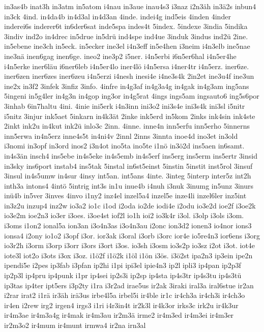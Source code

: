 {in3as4b
inat3h
in3atm
in5atom
i4nau
in3aue
inau4s3
i3naz
i2n3äh
in3ä2s
inbun4
in3ck
4ind.
in4da4b
in4d3al
in4d3an
4inde.
indei4g
ind5eis
4inden
4inder
inderei6s
inderer6t
in6der6sat
inde5spa
indes4t
5index.
5indexe
3india
5indika
3indiv
ind2o
in4drec
in5drue
in5drü
ind4spe
ind4ue
3induk
3indus
ind2ü
2ine.
in5ebene
ine3ch
in5eck.
in5ecker
ine3el
i4n3eff
in5e4hen
i3neim
i4n3elb
ine5nae
ine3nä
inen6gag
inen6ge.
ineo2
ine3p2
i5ner.
i4n5erbi
i6n5er6hal
i4n5er4he
i4n5erke
iner6läu
i6ner6leb
i4n5er4lo
iner4lö
i4n5ersa
i4ner4tr
i4n5erz.
iner6ze.
iner6zen
iner6zes
iner6zeu
i4n5erzi
i4nesh
inesi4e
i4ne3s4k
2in2et
ine3u4f
ine3un
ine2x
in3f2
3infek
3infiz
3info.
4infre
in4g3af
in4g3a4g
in4gak
in4g3am
ing5ans
5ingeni
in5g4ler
in4g3n
in4gop
ing3or
in4g5rat
4ings
ings5am
ingsauto6
ing5s6por
3inhab
6in7haltu
4ini.
4inie
ini5erk
i4n3inn
ini3o2
ini3s4e
ini3s4k
ini3sl
i5nitr
i5nitz
3injur
ink5aet
5inkarn
in4k3ät
2inke
ink5erd
in5kom
2inks
ink4sin
ink4ste
2inkt
ink2u
in4kut
ink2ü
inlo3c
2inn.
4inne.
inne4n
inn5erfu
inn5erho
5innerns
inn5erwa
in4n5erz
inne4s5t
in4ni4v
2innl
2inns
3innta
inoe4d
ino3et
in3old
i3nomi
in3opf
in3ord
inos2
i3n4ot
ino5ta
ino5te
i1nö
in3ö2d
ins5aen
in6samt.
in4s3än
insch4
ins5ebe
in4s5eke
in4s5emb
in4s5erf
ins5erg
ins5erm
ins5ertr
3insid
in3sky
ins6port
instab4
ins5tak
5instal
in6st5einst
5instin
5instit
inst5rol
3insuf
3insul
in4s5umw
in4sur
4insy
int5an.
int5ans
4inte.
3integ
5interp
inter5z
int2h
inth3a
intons4
4intö
5intrig
int3s
in1u
inue4b
i4nuh
i3nuk
3inumg
in5unz
3inurs
inü4b
in5ver
3inves
4invo
i1ny2
inz4el
inzel5a4
inzel5e
inze4li
inzel6ler
inz5int
in3z2u
inzup4
inz2w
io3a2
io1c
i1od
i2oda
io2de
iodi4e
i2odu
io3e2d
ioe2f
i3oe2k
io3e2m
ioe2n3
io3er
i3oes.
i3oe4st
iof2l
io1h
ioi2
io3k4r
i3ol.
i3olp
i3ols
i3om.
i3oms
i1on2
ional5a
ion3an
i3o4n3as
i3o4n3au
i2onc
ion3d2
ionen3
io4nor
ions3
ionsa4
i2ony
io1o2
i3opf
i3or.
ior3ak
i3oral
i3orb
i3orc
ior4e
io5re4n3
ior6ens
i3org
io3r2h
i3orm
i3orp
i3orr
i3ors
i3ort
i3os.
io3sh
i3osm
io3s2p
io3sz
i2ot
i3ot.
iot4e
iote3l
iot2o
i3ots
i3ox
i3oz.
i1ö2f
i1ö2k
i1öl
i1ön
i3ös.
i3ö2st
ipa2n3
ip3ein
ipe2n
ipendi5e
i2pes
ip3fab
i3pfan
ip2hi
i1pi
ipi3el
ipie4n3
ip2l
ipli3
ip4pan
ip2p3f
ip2p3l
ip4pru
ip4punk
i1pr
ip4sei
ip2s3i
ip2sp
ip4sta
ip4s3tr
ip4s3tu
ip4s3tü
ip3tas
ip4ter
ipt5ers
i3p2ty
i1ra
i3r2ad
irae5us
ir2ak
3iraki
iral3a
iral6stue
ir2an
i2rar
irat2
i1rä
ir3äh
irä3us
irbe4l5a
irbel5i
ir4ble
ir1c
ir4ch3a
ir4ch3i
ir4ch3o
ir4en
i2rew
irg2
irgen4
irgs3
i1ri
i4r3in4t
ir2k3l
ir4k3or
irks3c
irk2u
ir4k3ur
ir4m3ae
ir4m3a4g
ir4mak
ir4m3au
ir2m3ä
irme2
ir4m3ed
ir4m3ei
ir4m3er
ir2m3o2
ir4mum
ir4munt
irmwa4
ir2na
irn3al
}
